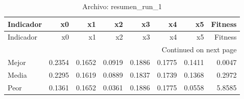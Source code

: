\begin{longtable}{lrrrrrrr}
\caption{Archivo: resumen\_run\_1}\label{tab:resumen_run_1} \\
\toprule
Indicador & x0 & x1 & x2 & x3 & x4 & x5 & Fitness \\
\midrule
\endfirsthead
\toprule
Indicador & x0 & x1 & x2 & x3 & x4 & x5 & Fitness \\
\midrule
\endhead
\midrule
\multicolumn{8}{r}{Continued on next page} \\
\midrule
\endfoot
\bottomrule
\endlastfoot
Mejor & 0.2354 & 0.1652 & 0.0919 & 0.1886 & 0.1775 & 0.1411 & 0.0047 \\
Media & 0.2295 & 0.1619 & 0.0889 & 0.1837 & 0.1739 & 0.1368 & 0.2972 \\
Peor & 0.1361 & 0.1652 & 0.0361 & 0.1886 & 0.1775 & 0.0558 & 5.8585 \\
\end{longtable}